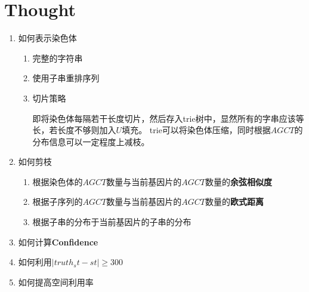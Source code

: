 \documentclass[hyperref,UTF8]{ctexart}
\theoremstyle{definition}
\theoremstyle{remark}
\numberwithin{equation}{subsection}
\newcommand{\Emph}{\textbf}
\begin{document}
\section{Thought}
\label{sec:thought}
		
	\begin{enumerate}
	
		\item 如何表示染色体
		
		\begin{enumerate}[(1)]
		
			\item 完整的字符串
			
			\item 使用子串重排序列

			\item 切片策略
			
			即将染色体每隔若干长度切片，然后存入trie树中，显然所有的字串应该等长，若长度不够则加入$U$填充。
			trie可以将染色体压缩，同时根据$AGCT$的分布信息可以一定程度上减枝。
			
		\end{enumerate}
		
		\item 如何剪枝
		
		\begin{enumerate}[(1)]
		
			\item 根据染色体的$AGCT$数量与当前基因片的$AGCT$数量的\Emph{余弦相似度}
			
			\item 根据子序列的$AGCT$数量与当前基因片的$AGCT$数量的\Emph{欧式距离}
			
			\item 根据子串的分布于当前基因片的子串的分布
		
		\end{enumerate}
		
		\item 如何计算\Emph{Confidence}
		
		\item 如何利用$|truth_st-st| \ge 300$
		
		\item 如何提高空间利用率
	
	\end{enumerate}
	
\end{document}
